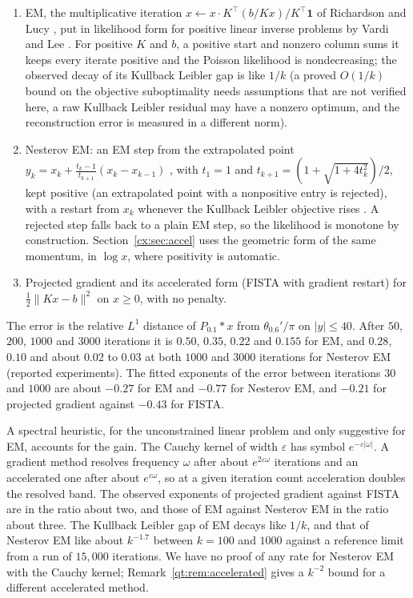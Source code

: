\begin{enumerate}
\item EM, the multiplicative iteration $x\leftarrow x\cdot K^\top(b/Kx)/K^\top\mathbf 1$ of Richardson \cite{Richardson72} and Lucy \cite{Lucy74}, put in likelihood form for positive linear inverse problems by Vardi and Lee \cite{VardiLee93}. For positive $K$ and $b$, a positive start and nonzero column sums it keeps every iterate positive and the Poisson likelihood is nondecreasing; the observed decay of its Kullback Leibler gap is like $1/k$ (a proved $O(1/k)$ bound on the objective suboptimality needs assumptions that are not verified here, a raw Kullback Leibler residual may have a nonzero optimum, and the reconstruction error is measured in a different norm).
\item Nesterov EM: an EM step from the extrapolated point $y_k=x_k+\frac{t_k-1}{t_{k+1}}(x_k-x_{k-1})$ \cite{Nesterov83}, with $t_1=1$ and $t_{k+1}=(1+\sqrt{1+4t_k^2})/2$, kept positive (an extrapolated point with a nonpositive entry is rejected), with a restart from $x_k$ whenever the Kullback Leibler objective rises \cite{OC15}. A rejected step falls back to a plain EM step, so the likelihood is monotone by construction. Section~\ref{cx:sec:accel} uses the geometric form of the same momentum, in $\log x$, where positivity is automatic.
\item Projected gradient and its accelerated form (FISTA with gradient restart) for $\frac12\|Kx-b\|^2$ on $x\ge0$, with no penalty.
\end{enumerate}

The error is the relative $L^1$ distance of $P_{0.1}*x$ from $\theta_{0.6}'/\pi$ on $|y|\le40$. After $50$, $200$, $1000$ and $3000$ iterations it is $0.50$, $0.35$, $0.22$ and $0.155$ for EM, and $0.28$, $0.10$ and about $0.02$ to $0.03$ at both $1000$ and $3000$ iterations for Nesterov EM (reported experiments). %
The fitted exponents of the error between iterations $30$ and $1000$ are about $-0.27$ for EM and $-0.77$ for Nesterov EM, and $-0.21$ for projected gradient against $-0.43$ for FISTA.

A spectral heuristic, for the unconstrained linear problem and only suggestive for EM, accounts for the gain. The Cauchy kernel of width $\varepsilon$ has symbol $e^{-\varepsilon|\omega|}$. A gradient method resolves frequency $\omega$ after about $e^{2\varepsilon\omega}$ iterations and an accelerated one after about $e^{\varepsilon\omega}$, so at a given iteration count acceleration doubles the resolved band. The observed exponents of projected gradient against FISTA are in the ratio about two, and those of EM against Nesterov EM in the ratio about three. The Kullback Leibler gap of EM decays like $1/k$, and that of Nesterov EM like about $k^{-1.7}$ between $k=100$ and $1000$ against a reference limit from a run of $15{,}000$ iterations. We have no proof of any rate for Nesterov EM with the Cauchy kernel; Remark~\ref{qt:rem:accelerated} gives a $k^{-2}$ bound for a different accelerated method.


